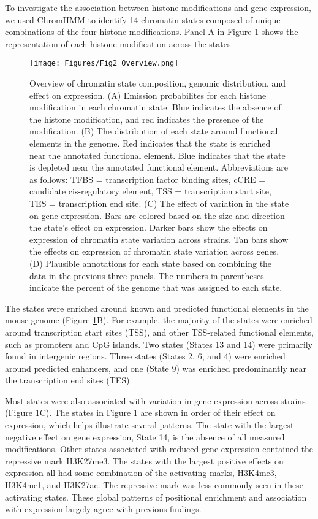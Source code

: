 \documentclass[
  11pt,
]{article}
\begin{document}
To investigate the association between histone modifications and gene
expression, we used ChromHMM to identify 14 chromatin states composed of
unique combinations of the four histone modifications. Panel A in Figure
\ref{fig:state_overview} shows the representation of each histone
modification across the states.

\begin{figure}[ht!]
\texttt{[image: Figures/Fig2\_Overview.png]} 
\caption{Overview of chromatin state composition, genomic 
distribution, and effect on expression. (A) Emission 
probabilites for each histone modification in each 
chromatin state. Blue indicates the absence of the histone
modification, and red indicates the presence of the 
modification. (B) The distribution of each state around 
functional elements in the genome. Red indicates that the 
state is enriched near the annotated functional element. 
Blue indicates that the state is depleted near the annotated 
functional element. Abbreviations are as follows: 
TFBS = transcription factor binding sites, cCRE = candidate 
cis-regulatory element, TSS = transcription 
start site, TES = transcription end site. (C) The effect of 
variation in the state on gene expression. Bars are colored 
based on the size and direction the state's effect on expression. 
Darker bars show the effects on expression of chromatin state 
variation across strains. Tan bars show the effects on expression 
of chromatin state variation across genes. (D) Plausible 
annotations for each state based on combining the data in 
the previous three panels. The numbers in parentheses indicate 
the percent of the genome that was assigned to each state.}
\label{fig:state_overview}
\end{figure}

The states were enriched around known and predicted functional elements
in the mouse genome (Figure \ref{fig:state_overview}B). For example, the
majority of the states were enriched around transcription start sites
(TSS), and other TSS-related functional elements, such as promoters and
CpG islands. Two states (States 13 and 14) were primarily found in
intergenic regions. Three states (States 2, 6, and 4) were enriched
around predicted enhancers, and one (State 9) was enriched predominantly
near the transcription end sites (TES).

Most states were also associated with variation in gene expression
across strains (Figure \ref{fig:state_overview}C). The states in Figure
\ref{fig:state_overview} are shown in order of their effect on
expression, which helps illustrate several patterns. The state with the
largest negative effect on gene expression, State 14, is the absence of
all measured modifications. Other states associated with reduced gene
expression contained the repressive mark H3K27me3. The states with the
largest positive effects on expression all had some combination of the
activating marks, H3K4me3, H3K4me1, and H3K27ac. The repressive mark was
less commonly seen in these activating states. These global patterns of
positional enrichment and association with expression largely agree with
previous findings.
\end{document}
